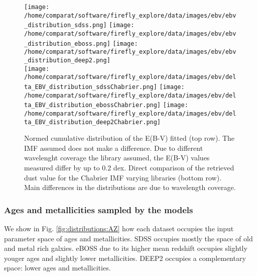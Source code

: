 \documentclass[onecolumn]{aa}
\begin{document}
\begin{figure}
\begin{center}
\caption{\label{fig:distributions:EBV} 
Normed cumulative distribution of the E(B-V) fitted (top row). The IMF assumed does not make a difference. Due to different wavelenght coverage the library assumed, the E(B-V) values measured differ by up to 0.2 dex. Direct comparison of the retrieved dust value for the Chabrier IMF varying libraries (bottom row). Main differences in the distributions are due to wavelength coverage.}  
\texttt{[image: /home/comparat/software/firefly\_explore/data/images/ebv/ebv\_distribution\_sdss.png]}
\texttt{[image: /home/comparat/software/firefly\_explore/data/images/ebv/ebv\_distribution\_eboss.png]}          
\texttt{[image: /home/comparat/software/firefly\_explore/data/images/ebv/ebv\_distribution\_deep2.png]} \\
\texttt{[image: /home/comparat/software/firefly\_explore/data/images/ebv/delta\_EBV\_distribution\_sdssChabrier.png]}
\texttt{[image: /home/comparat/software/firefly\_explore/data/images/ebv/delta\_EBV\_distribution\_ebossChabrier.png]}
\texttt{[image: /home/comparat/software/firefly\_explore/data/images/ebv/delta\_EBV\_distribution\_deep2Chabrier.png]}
\end{center}
\end{figure}


\subsubsection{Ages and metallicities sampled by the models}
We show in Fig. \ref{fig:distributions:AZ} how each dataset occupies the input parameter space of ages and metallicities. 
SDSS occupies mostly the space of old and metal rich galxies. 
eBOSS due to its higher mean redshift occupies slightly youger ages and slightly lower metallicities. 
DEEP2 occupies a complementary space: lower ages and metallicities.
\end{document}
